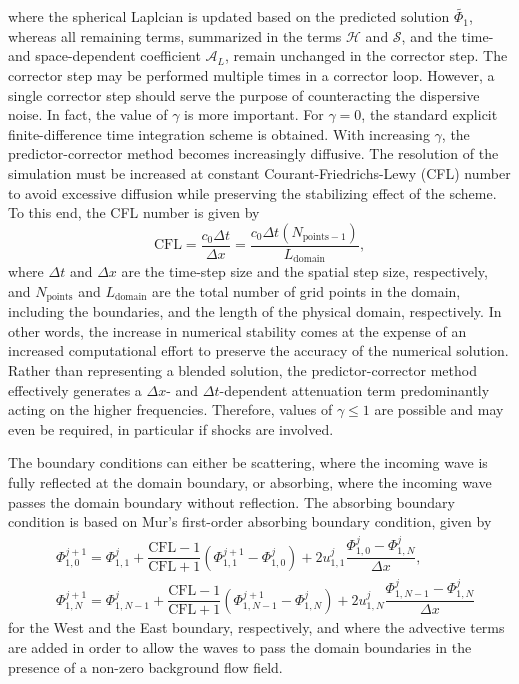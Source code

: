 where the spherical Laplcian is updated based on the predicted solution $\widetilde{\Phi_1}$, whereas all remaining terms, summarized in the terms $\mathcal{H}$ and $\mathcal{S}$, and the time- and space-dependent coefficient $\mathcal{A}_L$, remain unchanged in the corrector step. The corrector step may be performed multiple times in a corrector loop. However, a single corrector step should serve the purpose of counteracting the dispersive noise. In fact, the value of $\gamma$ is more important. For $\gamma=0$, the standard explicit finite-difference time integration scheme is obtained. With increasing $\gamma$, the predictor-corrector method becomes increasingly diffusive. The resolution of the simulation must be increased at constant Courant-Friedrichs-Lewy (CFL) number to avoid excessive diffusion while preserving the stabilizing effect of the scheme. To this end, the CFL number is given by
\begin{equation}
\mathrm{CFL} = \dfrac{c_0\Delta t}{\Delta x} = \dfrac{c_0\Delta t\left(N_{\mathrm{points}-1}\right)}{L_{\mathrm{domain}}},
\label{eq:CFL}
\end{equation}
where $\Delta t$ and $\Delta x$ are the time-step size and the spatial step size, respectively, and $N_{\mathrm{points}}$ and $L_{\mathrm{domain}}$ are the total number of grid points in the domain, including the boundaries, and the length of the physical domain, respectively. In other words, the increase in numerical stability comes at the expense of an increased computational effort to preserve the accuracy of the numerical solution. Rather than representing a blended solution, the predictor-corrector method effectively generates a $\Delta x$- and $\Delta t$-dependent attenuation term \citep{Nascimento_et_al_2010} predominantly acting on the higher frequencies. Therefore, values of $\gamma \le 1$ are possible and may even be required, in particular if shocks are involved. 

The boundary conditions can either be scattering, where the incoming wave is fully reflected at the domain boundary, or absorbing, where the incoming wave passes the domain boundary without reflection. The absorbing boundary condition is based on Mur's first-order absorbing boundary condition, given by \citep{Mur_1981}
\begin{align}
& \Phi_{1,0}^{j+1} = \Phi_{1,1}^{j} + \dfrac{\mathrm{CFL-1}}{\mathrm{CFL}+1}\left(\Phi_{1,1}^{j+1}-\Phi_{1,0}^{j}\right)
+ 2u_{1,1}^{j}\dfrac{\Phi_{1,0}^{j} - \Phi_{1,N}^{j}}{\Delta x},
\label{eq:Mur_West} \\[4pt]
& \Phi_{1,N}^{j+1} = \Phi_{1,N-1}^{j} + \dfrac{\mathrm{CFL-1}}{\mathrm{CFL}+1}\left(\Phi_{1,N-1}^{j+1}-\Phi_{1,N}^{j}\right)
+ 2u_{1,N}^{j}\dfrac{\Phi_{1,N-1}^{j} - \Phi_{1,N}^{j}}{\Delta x}
\label{eq:Mur_East}
\end{align}
for the West and the East boundary, respectively, and where the advective terms are added in order to allow the waves to pass the domain boundaries in the presence of a non-zero background flow field.

